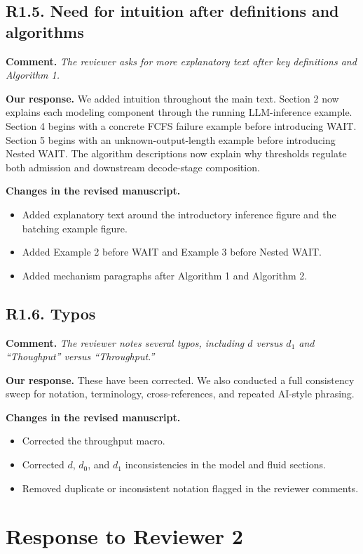 \documentclass[11pt]{article}
\newcommand{\comment}[1]{%
  \vspace{0.25em}
  \noindent\textbf{Comment.} \emph{#1}
}
\newcommand{\response}{\vspace{0.25em}\noindent\textbf{Our response.} }
\newcommand{\changes}{\vspace{0.25em}\noindent\textbf{Changes in the revised manuscript.} }
\begin{document}
\subsection*{R1.5. Need for intuition after definitions and algorithms}

\comment{The reviewer asks for more explanatory text after key definitions and Algorithm 1.}

\response We added intuition throughout the main text. Section 2 now explains each modeling component through the running LLM-inference example. Section 4 begins with a concrete FCFS failure example before introducing WAIT. Section 5 begins with an unknown-output-length example before introducing Nested WAIT. The algorithm descriptions now explain why thresholds regulate both admission and downstream decode-stage composition.

\changes
\begin{itemize}
    \item Added explanatory text around the introductory inference figure and the batching example figure.
    \item Added Example 2 before WAIT and Example 3 before Nested WAIT.
    \item Added mechanism paragraphs after Algorithm 1 and Algorithm 2.
\end{itemize}

\subsection*{R1.6. Typos}

\comment{The reviewer notes several typos, including \(d\) versus \(d_1\) and ``Thoughput'' versus ``Throughput.''}

\response These have been corrected. We also conducted a full consistency sweep for notation, terminology, cross-references, and repeated AI-style phrasing.

\changes
\begin{itemize}
    \item Corrected the throughput macro.
    \item Corrected \(d\), \(d_0\), and \(d_1\) inconsistencies in the model and fluid sections.
    \item Removed duplicate or inconsistent notation flagged in the reviewer comments.
\end{itemize}

\section*{Response to Reviewer 2}
\end{document}

